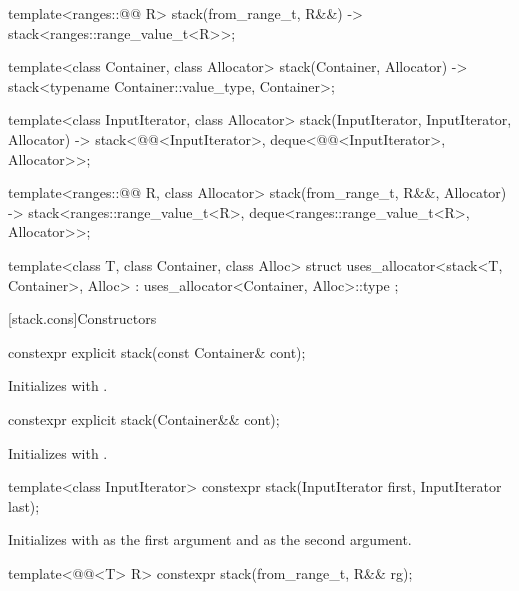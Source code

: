 \begin{codeblock}
{  template<ranges::@@ R>
    stack(from_range_t, R&&) -> stack<ranges::range_value_t<R>>;

  template<class Container, class Allocator>
    stack(Container, Allocator) -> stack<typename Container::value_type, Container>;

  template<class InputIterator, class Allocator>
    stack(InputIterator, InputIterator, Allocator)
      -> stack<@@<InputIterator>, deque<@@<InputIterator>,
               Allocator>>;

  template<ranges::@@ R, class Allocator>
    stack(from_range_t, R&&, Allocator)
      -> stack<ranges::range_value_t<R>, deque<ranges::range_value_t<R>, Allocator>>;

  template<class T, class Container, class Alloc>
    struct uses_allocator<stack<T, Container>, Alloc>
      : uses_allocator<Container, Alloc>::type { };
}
\end{codeblock}

[stack.cons]{Constructors}

%
\begin{itemdecl}
constexpr explicit stack(const Container& cont);
\end{itemdecl}

\begin{itemdescr}
\pnum
\effects
Initializes  with .
\end{itemdescr}

%
\begin{itemdecl}
constexpr explicit stack(Container&& cont);
\end{itemdecl}

\begin{itemdescr}
\pnum
\effects
Initializes  with .
\end{itemdescr}

%
\begin{itemdecl}
template<class InputIterator>
  constexpr stack(InputIterator first, InputIterator last);
\end{itemdecl}

\begin{itemdescr}
\pnum
\effects
Initializes  with
 as the first argument and  as the second argument.
\end{itemdescr}

%
\begin{itemdecl}
template<@@<T> R>
  constexpr stack(from_range_t, R&& rg);
\end{itemdecl}

